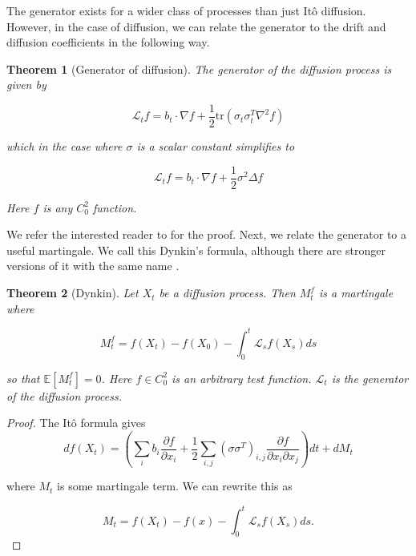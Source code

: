 \documentclass[12pt]{article}
\theoremstyle{break}
\newtheorem{theorem}{Theorem}[section]
\begin{document}
The generator exists for a wider class of processes than just Itô diffusion. However, in the case of diffusion, we can relate the generator to the drift and diffusion coefficients in the following way.

\begin{theorem}[Generator of diffusion]
	\label{thm:diffgen}
The generator of the diffusion process is given by

\begin{equation*}
	\mathcal{L}_t f = b_t \cdot \nabla f + \frac{1}{2} \mathrm{tr}(\sigma_t\sigma_t^T \nabla^2 f)	
\end{equation*}

which in the case where $\sigma$ is a scalar constant simplifies to 

\begin{equation*}
	\mathcal{L}_t f = b_t \cdot \nabla f + \frac{1}{2} \sigma^2 \Delta f	
\end{equation*}

Here $f$ is any $C^2_0$ function.
\end{theorem}

We refer the interested reader to \cite{karatzas1998} for the proof. Next, we relate the generator to a useful martingale. We call this Dynkin's formula, although there are stronger versions of it with the same name \cite{oksendal2013}.

\begin{theorem}[Dynkin]
Let $X_t$ be a diffusion process. Then $M_t^f$ is a martingale where

\begin{equation}
	\label{eq:mart}
	M_t^f = f(X_t) - f(X_0) - \int_0^t \mathcal{L}_s f(X_s) ds 
\end{equation}

so that $\mathbb{E}[M_t^f] = 0$. Here $f \in C^2_0$ is an arbitrary test function. $\mathcal{L}_t$ is the generator of the diffusion process.
\label{thm:mart}
\end{theorem}

\begin{proof}
	The Itô formula gives
	\begin{equation*}
		df(X_t) = \left(\sum_i b_i \frac{\partial f}{\partial x_i} + \frac{1}{2}\sum_{i,j}(\sigma \sigma^{T})_{i,j} \frac{\partial f}{\partial x_i \partial x_j} \right)dt + dM_t
	\end{equation*}

	where $M_t$ is some martingale term. We can rewrite this as 

	\begin{equation*}
		M_t = f(X_t) - f(x) - \int_0^t \mathcal{L}_sf(X_s)ds.
	\end{equation*}
\end{proof}
\end{document}
